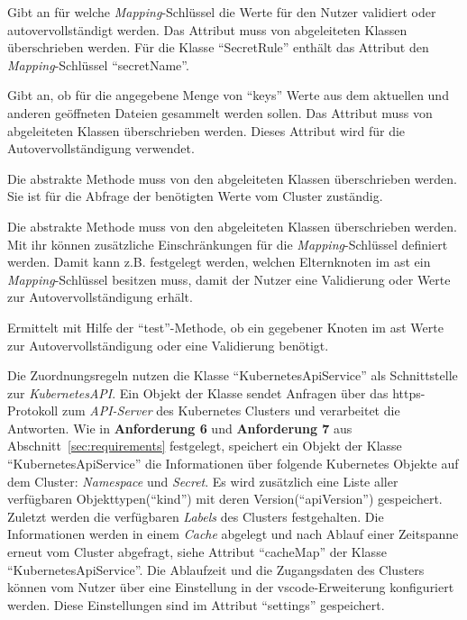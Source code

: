 \begin{description}
  \setlength\itemsep{-0.5cm}
  \item[keys]
        Gibt an für welche \textit{Mapping}-Schlüssel die Werte für den Nutzer validiert oder autovervollständigt werden.
        Das Attribut muss von abgeleiteten Klassen überschrieben werden.
        Für die Klasse ``SecretRule'' enthält das Attribut den \textit{Mapping}-Schlüssel ``secretName''.
  \item[shouldCollectValuesFromDocuments]
        Gibt an, ob für die angegebene Menge von ``keys'' Werte aus dem aktuellen und anderen geöffneten Dateien gesammelt werden sollen.
        Das Attribut muss von abgeleiteten Klassen überschrieben werden. Dieses Attribut wird für die Autovervollständigung verwendet.
  \item[getApiCompletionValues]
        Die abstrakte Methode muss von den abgeleiteten Klassen überschrieben werden. Sie ist für die Abfrage der benötigten Werte vom Cluster zuständig.
  \item[test]
        Die abstrakte Methode muss von den abgeleiteten Klassen überschrieben werden. Mit ihr können zusätzliche Einschränkungen
        für die \textit{Mapping}-Schlüssel definiert werden. Damit kann z.B. festgelegt werden, welchen Elternknoten im \ac{ast}
        ein \textit{Mapping}-Schlüssel besitzen muss, damit der Nutzer eine Validierung oder Werte zur Autovervollständigung erhält.
  \item[isApplicable]
        Ermittelt mit Hilfe der ``test''-Methode, ob ein gegebener Knoten im \ac{ast} Werte zur Autovervollständigung oder eine Validierung benötigt.
\end{description}

Die Zuordnungsregeln nutzen die Klasse ``KubernetesApiService'' als Schnittstelle zur \textit{KubernetesAPI}.
Ein Objekt der Klasse sendet Anfragen über das \ac{https}-Protokoll zum \textit{API-Server}
des Kubernetes Clusters und verarbeitet die Antworten. Wie in \textbf{Anforderung 6} und \textbf{Anforderung 7} aus Abschnitt~\ref{sec:requirements} festgelegt,
speichert ein Objekt der Klasse ``KubernetesApiService'' die Informationen über folgende Kubernetes Objekte auf dem Cluster: \textit{Namespace} und \textit{Secret}.
Es wird zusätzlich eine Liste aller verfügbaren Objekttypen(``kind'') mit deren Version(``apiVersion'') gespeichert.
Zuletzt werden die verfügbaren \textit{Labels} des Clusters festgehalten.
Die Informationen werden in einem \textit{Cache} abgelegt und nach Ablauf einer Zeitspanne erneut vom Cluster abgefragt, siehe
Attribut ``cacheMap'' der Klasse ``KubernetesApiService''.
Die Ablaufzeit und die Zugangsdaten des Clusters können vom Nutzer über eine Einstellung in der \ac{vscode}-Erweiterung
konfiguriert werden. Diese Einstellungen sind im Attribut ``settings'' gespeichert.


